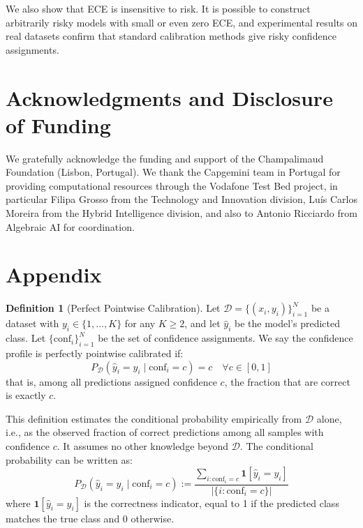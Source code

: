 \documentclass{article}
\theoremstyle{plain}
\theoremstyle{definition}
\newtheorem{definition}{Definition}
\theoremstyle{remark}
\begin{document}
We also show that ECE is insensitive to risk. It is possible to construct arbitrarily risky models with small or even zero ECE, and experimental results on real datasets confirm that standard calibration methods give risky confidence assignments.

\newpage

\section*{Acknowledgments and Disclosure of Funding}

We gratefully acknowledge the funding and support of the Champalimaud Foundation (Lisbon, Portugal). We thank the Capgemini team in Portugal for providing computational resources through the Vodafone Test Bed project, in particular Filipa Grosso from the Technology and Innovation division, Luís Carlos Moreira from the Hybrid Intelligence division, and also to Antonio Ricciardo from Algebraic AI for coordination.



{



}



\appendix

\section{Appendix}


\begin{definition}[Perfect Pointwise Calibration]\label{def:perfect_pointwise_calibration}
Let $\mathcal{D} = \{(x_i, y_i)\}_{i=1}^N$ be a dataset with $y_i \in \{1, \ldots, K\}$ for any $K \geq 2$, and let $\hat{y}_i$ be the model's predicted class. Let $\{\text{conf}_i\}_{i=1}^N$ be the set of confidence assignments.  We say the confidence profile is perfectly pointwise calibrated if: \[
P_{\mathcal{D}}(\hat{y}_i = y_i \mid \text{conf}_i = c) = c \quad \forall c \in [0,1] 
\]
that is, among all predictions assigned confidence $c$, the fraction that are correct is exactly $c$.
\end{definition}
\bigskip

This definition estimates the conditional probability empirically from $\mathcal{D}$ alone, i.e., as the observed fraction of correct predictions among all samples with confidence $c$. It assumes no other knowledge beyond  $\mathcal{D}$.  The conditional probability can be written as:
\[
P_{\mathcal{D}}(\hat{y}_i = y_i \mid \text{conf}_i = c) := \frac{\sum_{i:\text{conf}_i = c} \mathbf{1}[\hat{y}_i = y_i]}{\vert \{i: \text{conf}_i = c\} \vert} 
 \]
where $\mathbf{1}[\hat{y}_i = y_i]$ is the correctness indicator, equal to 1 if the predicted class matches the true class and 0 otherwise. 
\end{document}

